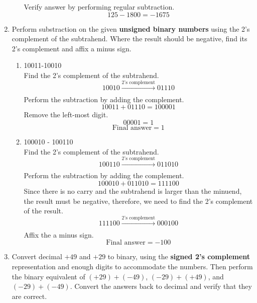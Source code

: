 \documentclass[12pt]{book}
\begin{document}
\begin{enumerate}
\begin{enumerate}
        Verify answer by performing regular subtraction.
        $$125 - 1800 = -1675$$
        
    \end{enumerate}
    
    \item Perform substraction on the given \textbf{unsigned binary numbers} using the 2's complement of the subtrahend. Where the result should be negative, find its 2's complement and affix a minus sign.
    
    \begin{enumerate}
        \item 10011-10010\\
        
        Find the 2's complement of the subtrahend.
        $$10010 \xrightarrow[]{\text{2's complement}} 01110$$
        Perform the subtraction by adding the complement.
        $$10011 + 01110 = 100001$$
        Remove the left-most digit.
        $$00001 = 1$$
        $$\text{Final answer} = 1$$
        
        \item 100010 - 100110\\
        
        Find the 2's complement of the subtrahend.
        $$100110 \xrightarrow[]{\text{2's complement}} 011010$$
        Perform the subtraction by adding the complement.
        $$100010 + 011010 = 111100$$
        Since there is no carry and the subtrahend is larger than the minuend, the result must be negative, therefore, we need to find the 2's complement of the result.
        $$111100 \xrightarrow[]{\text{2's complement}} 000100$$
        Affix the a minus sign.\\
        $$\text{Final answer} = -100$$
    \end{enumerate}
    
    \item Convert decimal $+49$ and $+29$ to binary, using the \textbf{signed 2's complement} representation and enough digits to accommodate the numbers. Then perform the binary equivalent of $(+29)+(-49)$, $(-29)+(+49)$, and $(-29)+(-49)$. Convert the answers back to decimal and verify that they are correct.\\
    

\end{enumerate}
\end{document}
